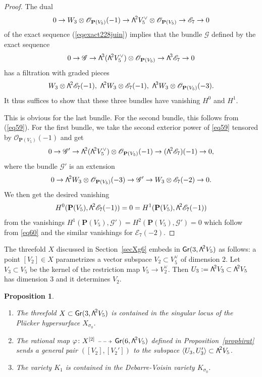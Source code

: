\documentclass[11pt]{article}
\makeatletter
\newcommand{\skpt}{\smallskip}
\let\mathcal\mathscr
\newenvironment{enumeratea}
{\bgroup\def\theenumi{\alph{enumi}}\def\theenumii{\arabic{enumii}}\begin{enumerate}}
{\end{enumerate}\egroup}
\newcommand{\dradpl}{{\!\!\xymatrix@C=8mm{\ar@{-->}[r]&}\!\!}}
\newcommand{\dratst}{{\,\mathrel{\scalebox{.8}{$\dradpl$}}\,}}
\newcommand{\drascst}{{\,\mathrel{\scalebox{.6}{$\dradpl$}}\,}}
\newcommand{\dra}{\mathchoice{\dradpl}{\dratst}{\drascst}{\drascst}}
\newtheorem{prop}[lemm]{Proposition}
\theoremstyle{definition}
\renewcommand\P{{\mathbf P}}\let\PP\P
\newcommand\cE{\mathcal{E}}
\newcommand\cG{\mathcal{G}}
\newcommand\cO{\mathcal{O}}\let\OO\cO
\DeclareMathOperator{\Gr}{\mathsf{Gr}}
\let\phi\varphi
\let\dual\vee
\newcommand\bw[1]{{\hbox{\large$\mathsf{\Lambda}$}^{\!#1}}}
\renewcommand{\dratst}{\mathrel{\scalebox{.8}{$\dradpl$}}}
\renewcommand{\drascst}{\mathrel{\scalebox{.6}{$\dradpl$}}}
\makeatother
\begin{document}
\begin{proof}
The dual
\begin{equation}\label{eq59}
0\to W_3\otimes \cO_{\P(V_5)}(-1)\to \bw2V_5^\dual\otimes \cO_{\P(V_5)}\to \cE_7\to0
\end{equation}
of the exact sequence
(\ref{eqexact228juin}) implies that the bundle $\cG$ defined by
the exact sequence
\[
0\to\cG\to \bw3(\bw2V_5^\dual)\otimes \cO_{\P(V_5)}\to \bw3\cE_7\to 0
\]
has a filtration with graded pieces
\[
W_3\otimes \bw2\cE_7(-1),\ \bw2W_3\otimes \cE_7(-1),\ \bw3W_3\otimes \cO_{\P(V_5)}(-3).
\]
It thus suffices to show that these three bundles have vanishing
$H^0$ and $H^1$.

This is obvious for the last bundle. For the second bundle, this follows from (\ref{eq59}).
For the first bundle, we take the second exterior power of
\eqref{eq59} tensored by
$ \cO_{\P(V_5)}(-1)$ and get
\[
0\to\cG'\to \bw2(\bw2V_5^\dual)\otimes \cO_{\P(V_5)}(-1)\to ( \bw2\cE_7)(-1)\to 0,
\]
where the bundle
$\cG'$ is an extension
\begin{equation}\label{eq60}
0\to \bw2W_3\otimes \cO_{\P(V_5)}(-3)\to\cG'\to
W_3\otimes \cE_7(-2)\to0.
\end{equation}
We then get the desired vanishing
\[
H^0(\P(V_5),\bw2\cE_7(-1))=0=H^1(\P(V_5),\bw2\cE_7(-1))
\]
from
the vanishings $H^1(\P(V_5),\cG')=H^2(\P(V_5),\cG')=0$ which follow from
\eqref{eq60} and the similar vanishings for $\cE_7(-2)$.
\end{proof}

The threefold $X$ discussed in Section~\ref{secXg6} embeds
in $\Gr(3,\bw2V_5)$ as follows:
a point $[V_2]\in X$ parametrizes a vector subspace $V_2\subset V_5^\dual$ of dimension
$2$. Let $V_3\subset V_5$ be the kernel of the restriction map
$V_5\to V_2^\dual$. Then
$U_3:=\bw2V_3\subset \bw2V_5$ has dimension $3$ and it determines $V_2$.

\skpt
\begin{prop}\label{lexsing}
\begin{enumeratea}
\item\label{lexsinga}
The threefold $X\subset \Gr(3,\bw2V_5)$ is contained
in the singular locus
of the Plücker hypersurface $X_{\sigma_0}$.

\item\label{lexsingb}
The rational map $\phi\colon X^{[2]}\dra \Gr(6,\bw2V_5)$ defined in Proposition~\ref{propbirat}
sends a general pair $([V_2],[V_2'])$ to the subspace
$\langle U_3,U'_3\rangle\subset \bw2V_5$.

\item\label{lexsingc}
The variety $K_1$ is contained in the Debarre-Voisin variety $K_{\sigma_0}$.
\end{enumeratea}
\end{prop}
\end{document}
